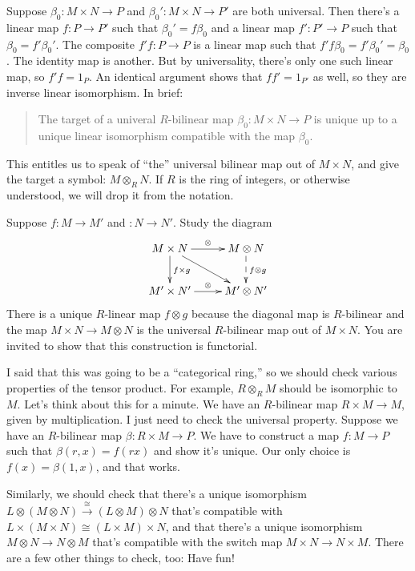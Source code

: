 \begin{property}[Uniqueness]
Suppose $\beta_0:M\times N\to P$ and $\beta_0':M\times N\to P'$ are both universal. Then there's a linear map $f:P\to P'$ such that $\beta_0'=f\beta_0$ and a linear map $f':P'\to P$ such that $\beta_0=f'\beta_0'$. 
The composite $f'f:P\to P$ is a linear map such that $f'f\beta_0=f'\beta_0'=\beta_0$. The identity map is another. But by universality, there's only one such linear map, so $f'f=1_P$. An identical argument shows that $ff'=1_{P'}$ as well, so they are inverse linear isomorphism. In brief: 
\begin{quote}
The target of a univeral $R$-bilinear map $\beta_0:M\times N\to P$ is unique up to a unique linear isomorphism compatible with the map $\beta_0$.
\end{quote}
This entitles us to speak of ``the'' universal bilinear map out of $M\times N$,
and give the target a symbol: $M\otimes_R N$. If $R$ is the ring of integers, or otherwise understood, we will drop it from the notation. 
\end{property}

\begin{property}[Functoriality] Suppose $f:M\to M'$ and $:N\to N'$. Study the diagram
\begin{equation*}
\xymatrix{M\times N\ar[d]^{f\times g}\ar[r]^\otimes\ar[dr] & M\otimes N\ar@{-->}[d]^{f\otimes g}\\
M^\prime\times N^\prime\ar[r]^\otimes & M^\prime\otimes N^\prime}
\end{equation*}
There is a unique $R$-linear map $f\otimes g$ because the diagonal map 
is $R$-bilinear and the map $M\times N\to M\otimes N$ is the universal
$R$-bilinear map out of $M\times N$. 
You are invited to show that this construction is functorial. 
\end{property}

\begin{property} 
I said that this was going to be a ``categorical ring,'' so we should check various properties of the tensor product. For example, $R\otimes_R M$ should be isomorphic to $M$. Let's think about this for a minute. We have an $R$-bilinear map $R\times M\to M$, given by multiplication. 
I just need to check the universal property. Suppose we have an $R$-bilinear map $\beta:R\times M\to P$. We have to construct a map $f:M\to P$ such that 
$\beta(r,x)=f(rx)$ and show it's unique. Our only choice is $f(x)=\beta(1,x)$,
and that works.

Similarly, we should check that there's a unique isomorphism $L\otimes(M\otimes N)\xrightarrow{\cong}(L\otimes M)\otimes N$ that's compatible with $L\times (M\times N)\cong (L\times M)\times N$, and that there's a unique isomorphism $M\otimes N\to N\otimes M$ that's compatible with the switch map $M\times N\to N\times M$. There are a few other things to check, too: Have fun!
\end{property}

